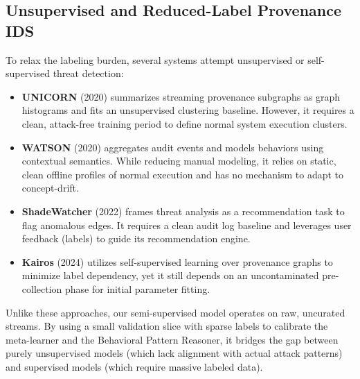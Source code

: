\subsection{Unsupervised and Reduced-Label Provenance IDS}
To relax the labeling burden, several systems attempt unsupervised or self-supervised threat detection:
\begin{itemize}
\item \textbf{UNICORN} (2020) \cite{han2020unicorn} summarizes streaming provenance subgraphs as graph histograms and fits an unsupervised clustering baseline. However, it requires a clean, attack-free training period to define normal system execution clusters.
\item \textbf{WATSON} (2020) \cite{gao2020watson} aggregates audit events and models behaviors using contextual semantics. While reducing manual modeling, it relies on static, clean offline profiles of normal execution and has no mechanism to adapt to concept-drift.
\item \textbf{ShadeWatcher} (2022) \cite{yang2022shadewatcher} frames threat analysis as a recommendation task to flag anomalous edges. It requires a clean audit log baseline and leverages user feedback (labels) to guide its recommendation engine.
\item \textbf{Kairos} (2024) \cite{cheng2024kairos} utilizes self-supervised learning over provenance graphs to minimize label dependency, yet it still depends on an uncontaminated pre-collection phase for initial parameter fitting.
\end{itemize}
Unlike these approaches, our semi-supervised model operates on raw, uncurated streams. By using a small validation slice with sparse labels to calibrate the meta-learner and the Behavioral Pattern Reasoner, it bridges the gap between purely unsupervised models (which lack alignment with actual attack patterns) and supervised models (which require massive labeled data).

